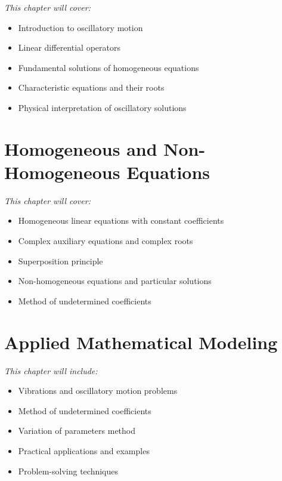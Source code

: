 \documentclass[12pt, letterpaper]{book}
\theoremstyle{problemstyle}
\theoremstyle{solutionstyle}
\begin{document}
\textit{This chapter will cover:}
\begin{itemize}
    \item Introduction to oscillatory motion
    \item Linear differential operators
    \item Fundamental solutions of homogeneous equations
    \item Characteristic equations and their roots
    \item Physical interpretation of oscillatory solutions
\end{itemize}

\chapter{Homogeneous and Non-Homogeneous Equations}
\label{chap:session_6}

\textit{This chapter will cover:}
\begin{itemize}
    \item Homogeneous linear equations with constant coefficients
    \item Complex auxiliary equations and complex roots
    \item Superposition principle
    \item Non-homogeneous equations and particular solutions
    \item Method of undetermined coefficients
\end{itemize}

\chapter{Applied Mathematical Modeling}
\label{chap:session_7}

\textit{This chapter will include:}
\begin{itemize}
    \item Vibrations and oscillatory motion problems
    \item Method of undetermined coefficients
    \item Variation of parameters method
    \item Practical applications and examples
    \item Problem-solving techniques
\end{itemize}

\end{document}
